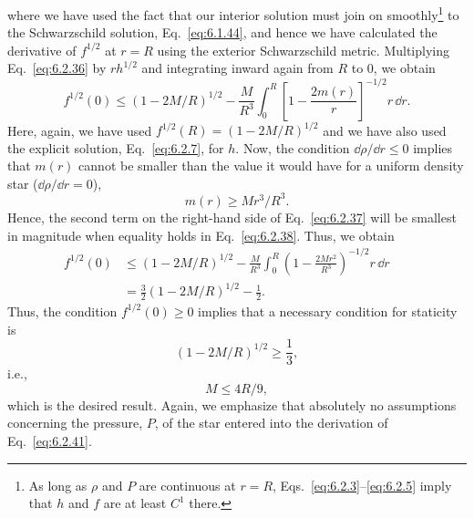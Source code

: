 where we have used the fact that our interior solution must join on
smoothly\footnote{As long as \(\rho\) and \(P\) are continuous at \(r=R\),
Eqs.~\eqref{eq:6.2.3}--\eqref{eq:6.2.5} imply that \(h\) and \(f\) are at least
\(C^1\) there.} to the Schwarzschild solution, Eq.~\eqref{eq:6.1.44}, and
hence we have calculated the derivative of \(f^{1/2}\) at \(r=R\) using the
exterior Schwarzschild metric. Multiplying Eq.~\eqref{eq:6.2.36} by
\(rh^{1/2}\) and integrating inward again from \(R\) to \(0\), we obtain
\begin{equation}
  f^{1/2}(0)\leq(1-2M/R)^{1/2}
    -\frac{M}{R^3}\int_0^R
      \left[1-\frac{2m(r)}{r}\right]^{-1/2}r\,\dd r.
  \tag{6.2.37}\label{eq:6.2.37}
\end{equation}
Here, again, we have used \(f^{1/2}(R)=(1-2M/R)^{1/2}\) and we have also used
the explicit solution, Eq.~\eqref{eq:6.2.7}, for \(h\). Now, the condition
\(\dd\rho/\dd r\leq0\) implies that \(m(r)\) cannot be smaller than the value it would
have for a uniform density star (\(\dd\rho/\dd r=0\)),
\begin{equation}
  m(r)\geq Mr^3/R^3.
  \tag{6.2.38}\label{eq:6.2.38}
\end{equation}
Hence, the second term on the right-hand side of Eq.~\eqref{eq:6.2.37} will be
smallest in magnitude when equality holds in Eq.~\eqref{eq:6.2.38}. Thus, we
obtain
\begin{align}
  f^{1/2}(0)
    &\leq(1-2M/R)^{1/2}
       -\frac{M}{R^3}\int_0^R
         \left(1-\frac{2Mr^2}{R^3}\right)^{-1/2}r\,\dd r\nonumber\\
    &=\frac32(1-2M/R)^{1/2}-\frac12.
  &&\tag{6.2.39}\label{eq:6.2.39}
\end{align}
Thus, the condition \(f^{1/2}(0)\geq0\) implies that a necessary condition for
staticity is
\begin{equation}
  (1-2M/R)^{1/2}\geq\frac13,
  \tag{6.2.40}\label{eq:6.2.40}
\end{equation}
i.e.,
\begin{equation}
  M\leq4R/9,
  \tag{6.2.41}\label{eq:6.2.41}
\end{equation}
which is the desired result. Again, we emphasize that absolutely no assumptions
concerning the pressure, \(P\), of the star entered into the derivation of
Eq.~\eqref{eq:6.2.41}.

